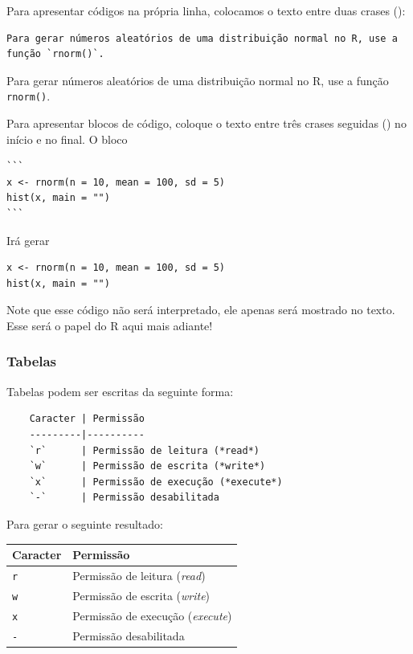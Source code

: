 \documentclass[10pt,a4paper]{book}
\begin{document}
Para apresentar códigos na própria linha, colocamos o texto entre duas
crases (\texttt{\textasciigrave{}}):

\begin{verbatim}
Para gerar números aleatórios de uma distribuição normal no R, use a
função `rnorm()`.
\end{verbatim}

Para gerar números aleatórios de uma distribuição normal no R, use a
função \texttt{rnorm()}.

Para apresentar blocos de código, coloque o texto entre três crases
seguidas (\texttt{\textasciigrave{}\textasciigrave{}\textasciigrave{}})
no início e no final. O bloco

\begin{verbatim}
```
x <- rnorm(n = 10, mean = 100, sd = 5)
hist(x, main = "")
```
\end{verbatim}

Irá gerar

\begin{verbatim}
x <- rnorm(n = 10, mean = 100, sd = 5)
hist(x, main = "")
\end{verbatim}

Note que esse código não será interpretado, ele apenas será mostrado no
texto. Esse será o papel do R aqui mais adiante!

\subsubsection*{Tabelas}\label{tabelas}


Tabelas podem ser escritas da seguinte forma:

\begin{verbatim}
    Caracter | Permissão
    ---------|----------
    `r`      | Permissão de leitura (*read*)
    `w`      | Permissão de escrita (*write*)
    `x`      | Permissão de execução (*execute*)
    `-`      | Permissão desabilitada
\end{verbatim}

Para gerar o seguinte resultado:

\begin{longtable}[]{@{}ll@{}}
\toprule
Caracter & Permissão\tabularnewline
\midrule
\endhead
\texttt{r} & Permissão de leitura (\emph{read})\tabularnewline
\texttt{w} & Permissão de escrita (\emph{write})\tabularnewline
\texttt{x} & Permissão de execução (\emph{execute})\tabularnewline
\texttt{-} & Permissão desabilitada\tabularnewline
\bottomrule
\end{longtable}
\end{document}
